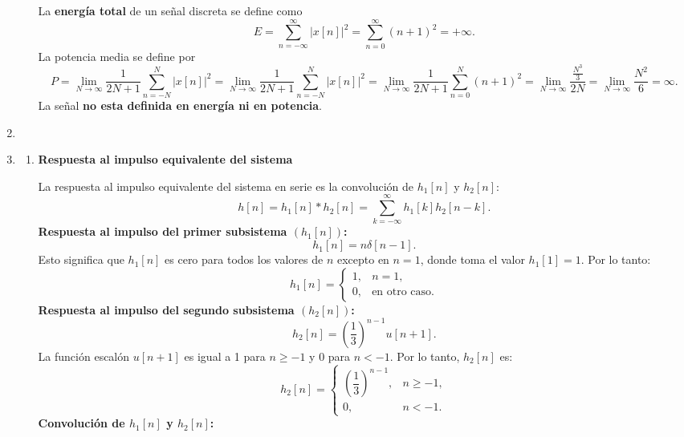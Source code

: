 \begin{enumerate}[label=\color{red}\textbf{\arabic*)}]
\begin{enumerate}[label=\color{red}\textbf{\alph*)}]
        La \textbf{energía total} de un señal discreta se define como \[
            E=\sum_{n=-\infty}^{\infty} |x[n]|^2=\sum_{n=0}^{\infty} (n+1)^2=+\infty.
        \] 
        La potencia media se define por \[
            P=\lim_{N \to \infty} \dfrac{1}{2N+1}\sum_{n=-N}^{N} |x[n]|^2=\lim_{N \to \infty} \dfrac{1}{2N+1}\sum_{n=-N}^{N} |x[n]|^2=\lim_{N \to \infty} \dfrac{1}{2N+1}\sum_{n=0}^{N} (n+1)^2=\lim_{N \to \infty} \dfrac{\frac{N^3}{3} }{2N}=\lim_{N \to \infty} \dfrac{N^2}{6}=\infty.
        \] 
        La señal \textbf{no esta definida en energía ni en potencia}.
\end{enumerate}
\item {} 
\item {} 
\begin{enumerate}[label=\textbf{Paso \arabic*:}]
    \item \textbf{Respuesta al impulso equivalente del sistema}

        La respuesta al impulso equivalente del sistema en serie es la convolución de $h_1[n]$ y $h_2[n]$: \[
            h[n]=h_1[n]\ast h_2[n]=\sum_{k=-\infty}^{\infty} h_1[k]h_2[n-k].
        \] 
        \textbf{Respuesta al impulso del primer subsistema $(h_1[n])$:}\[
            h_1[n]=n\delta[n-1].
        \] 
        Esto significa que $h_1[n]$ es cero para todos los valores de $n$ excepto en $n=1$, donde toma el valor  $h_1[1]=1$. Por lo tanto: \[
            h_1[n]=\begin{cases}
                1, & n=1,\\
                0, & \text{en otro caso}.
            \end{cases}
        \] 
        \textbf{Respuesta al impulso del segundo subsistema $(h_2[n])$:} \[
            h_2[n]=\left( \dfrac{1}{3} \right) ^{n-1}u[n+1].
        \] 
        La función escalón $u[n+1]$ es igual a 1 para $n\ge -1$ y 0 para $n<-1$. Por lo tanto, $h_2[n]$ es: \[
            h_2[n]=\begin{cases}
                \left( \dfrac{1}{3} \right) ^{n-1}, & n\ge -1,\\
                0, & n<-1.
            \end{cases}
        \] 
        \textbf{Convolución de $h_1[n]$ y $h_2[n]$:} 


\end{enumerate}
\end{enumerate}
